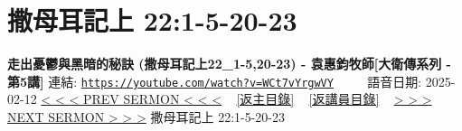 \documentclass{book}
\begin{document}
\section{撒母耳記上 22:1-5-20-23}
\label{sec:WCt7vYrgwVY}
\textbf{走出憂鬱與黑暗的秘訣 (撒母耳記上22\_1-5,20-23) - 袁惠鈞牧師[大衛傳系列 - 第5講]}
\newline
\newline
連結: \href{https://youtube.com/watch?v=WCt7vYrgwVY}{\texttt{https://youtube.com/watch?v=WCt7vYrgwVY}} ~~~~ 語音日期: 2025-02-12
\newline
\newline
\hyperref[sec:rN0dS2BBBmc]{< < < PREV SERMON < < <}
~
\hyperlink{toc}{[返主目錄]}
~
\hyperref[ch:preacher12]{[返講員目錄]}
~
\hyperref[sec:GqTOPwqfjwM]{> > > NEXT SERMON > > >}
\newline
\newline
撒母耳記上 22:1-5-20-23
\newline
\end{document}
